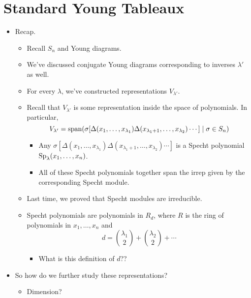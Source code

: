 \documentclass[../notes.tex]{subfiles}
\begin{document}
\section{Standard Young Tableaux}
\begin{itemize}
    \item {}Recap.
    \begin{itemize}
        \item Recall $S_n$ and Young diagrams.
        \item We've discussed conjugate Young diagrams corresponding to inverses $\lambda'$ as well.
        \item For every $\lambda$, we've constructed representations $V_{\lambda'}$.
        \item Recall that $V_{\lambda'}$ is some representation inside the space of polynomials. In particular,
        \begin{equation*}
            V_{\lambda'} = \operatorname{span}(\sigma[\Delta(x_1,\dots,x_{\lambda_1})\Delta(x_{\lambda_1+1},\dots,x_{\lambda_2})\cdots]\mid\sigma\in S_n)
        \end{equation*}
        \begin{itemize}
            \item Any $\sigma[\Delta(x_1,\dots,x_{\lambda_1})\Delta(x_{\lambda_1+1},\dots,x_{\lambda_2})\cdots]$ is a Specht polynomial $\operatorname{Sp}_\lambda(x_1,\dots,x_n)$.
            \item All of these Specht polynomials together span the irrep given by the corresponding Specht module.
        \end{itemize}
        \item Last time, we proved that Specht modules are irreducible.
        \item Specht polynomials are polynomials in $R_d$, where $R$ is the ring of polynomials in $x_1,\dots,x_n$ and
        \begin{equation*}
            d = \binom{\lambda_1}{2}+\binom{\lambda_2}{2}+\cdots
        \end{equation*}
        \begin{itemize}
            \item What is this definition of $d$??
        \end{itemize}
    \end{itemize}
    \item So how do we further study these representations?
    \begin{itemize}
        \item Dimension?

\end{itemize}
\end{itemize}
\end{document}
